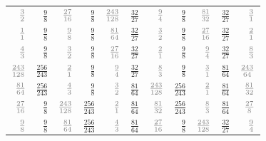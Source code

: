 \begin{tabular}{rrrrrrrrrrr}
\small $\mathcolor{gray}{\frac{3}{2}}$ & \Large $\frac{9}{8}$ & \small $\mathcolor{gray}{\frac{27}{16}}$ & \Large $\frac{9}{8}$ & \small $\mathcolor{gray}{\frac{243}{128}}$ & \Large $\frac{32}{27}$ & \small $\mathcolor{gray}{\frac{9}{4}}$ & \Large $\frac{9}{8}$ & \small $\mathcolor{gray}{\frac{81}{32}}$ & \Large $\frac{32}{27}$ & \small $\mathcolor{gray}{\frac{3}{1}}$ \\
\small $\mathcolor{gray}{\frac{1}{1}}$ & \Large $\frac{9}{8}$ & \small $\mathcolor{gray}{\frac{9}{8}}$ & \Large $\frac{9}{8}$ & \small $\mathcolor{gray}{\frac{81}{64}}$ & \Large $\frac{32}{27}$ & \small $\mathcolor{gray}{\frac{3}{2}}$ & \Large $\frac{9}{8}$ & \small $\mathcolor{gray}{\frac{27}{16}}$ & \Large $\frac{32}{27}$ & \small $\mathcolor{gray}{\frac{2}{1}}$ \\
\small $\mathcolor{gray}{\frac{4}{3}}$ & \Large $\frac{9}{8}$ & \small $\mathcolor{gray}{\frac{3}{2}}$ & \Large $\frac{9}{8}$ & \small $\mathcolor{gray}{\frac{27}{16}}$ & \Large $\frac{32}{27}$ & \small $\mathcolor{gray}{\frac{2}{1}}$ & \Large $\frac{9}{8}$ & \small $\mathcolor{gray}{\frac{9}{4}}$ & \Large $\frac{32}{27}$ & \small $\mathcolor{gray}{\frac{8}{3}}$ \\
\small $\mathcolor{gray}{\frac{243}{128}}$ & \Large $\frac{256}{243}$ & \small $\mathcolor{gray}{\frac{2}{1}}$ & \Large $\frac{9}{8}$ & \small $\mathcolor{gray}{\frac{9}{4}}$ & \Large $\frac{32}{27}$ & \small $\mathcolor{gray}{\frac{8}{3}}$ & \Large $\frac{9}{8}$ & \small $\mathcolor{gray}{\frac{3}{1}}$ & \Large $\frac{81}{64}$ & \small $\mathcolor{gray}{\frac{243}{64}}$ \\
\small $\mathcolor{gray}{\frac{81}{64}}$ & \Large $\frac{256}{243}$ & \small $\mathcolor{gray}{\frac{4}{3}}$ & \Large $\frac{9}{8}$ & \small $\mathcolor{gray}{\frac{3}{2}}$ & \Large $\frac{81}{64}$ & \small $\mathcolor{gray}{\frac{243}{128}}$ & \Large $\frac{256}{243}$ & \small $\mathcolor{gray}{\frac{2}{1}}$ & \Large $\frac{81}{64}$ & \small $\mathcolor{gray}{\frac{81}{32}}$ \\
\small $\mathcolor{gray}{\frac{27}{16}}$ & \Large $\frac{9}{8}$ & \small $\mathcolor{gray}{\frac{243}{128}}$ & \Large $\frac{256}{243}$ & \small $\mathcolor{gray}{\frac{2}{1}}$ & \Large $\frac{81}{64}$ & \small $\mathcolor{gray}{\frac{81}{32}}$ & \Large $\frac{256}{243}$ & \small $\mathcolor{gray}{\frac{8}{3}}$ & \Large $\frac{81}{64}$ & \small $\mathcolor{gray}{\frac{27}{8}}$ \\
\small $\mathcolor{gray}{\frac{9}{8}}$ & \Large $\frac{9}{8}$ & \small $\mathcolor{gray}{\frac{81}{64}}$ & \Large $\frac{256}{243}$ & \small $\mathcolor{gray}{\frac{4}{3}}$ & \Large $\frac{81}{64}$ & \small $\mathcolor{gray}{\frac{27}{16}}$ & \Large $\frac{9}{8}$ & \small $\mathcolor{gray}{\frac{243}{128}}$ & \Large $\frac{32}{27}$ & \small $\mathcolor{gray}{\frac{9}{4}}$ \\
\end{tabular}
